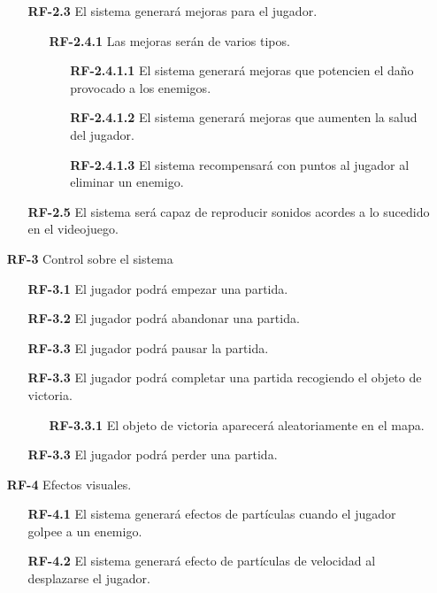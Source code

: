 \begin{enumerate}
\begin{enumerate}
        \item[\textbf{RF-2.3}] El sistema generará mejoras para el jugador. 
        \begin{enumerate}
            \item[\textbf{RF-2.4.1}] Las mejoras serán de varios tipos.
            \begin{enumerate}
                \item[\textbf{RF-2.4.1.1}] El sistema generará mejoras que potencien el daño provocado a los enemigos.
                \item[\textbf{RF-2.4.1.2}] El sistema generará mejoras que aumenten la salud del jugador.
                \item[\textbf{RF-2.4.1.3}] El sistema recompensará con puntos al jugador al eliminar un enemigo.
            \end{enumerate}
        \end{enumerate}
        \item[\textbf{RF-2.5}] El sistema será capaz de reproducir sonidos acordes a lo sucedido en el videojuego.
    \end{enumerate}
    \item[\textbf{RF-3}] Control sobre el sistema
    \begin{enumerate}
        \item[\textbf{RF-3.1}] El jugador podrá empezar una partida.
        \item[\textbf{RF-3.2}] El jugador podrá abandonar una partida.
        \item[\textbf{RF-3.3}] El jugador podrá pausar la partida.
        \item[\textbf{RF-3.3}] El jugador podrá completar una partida recogiendo el objeto de victoria.
        \begin{enumerate}
            \item[\textbf{RF-3.3.1}] El objeto de victoria aparecerá aleatoriamente en el mapa. 
        \end{enumerate}
        \item[\textbf{RF-3.3}] El jugador podrá perder una partida.
    \end{enumerate}
    \item[\textbf{RF-4}] Efectos visuales.
    \begin{enumerate}
        \item[\textbf{RF-4.1}] El sistema generará efectos de partículas cuando el jugador golpee a un enemigo.
        \item[\textbf{RF-4.2}] El sistema generará efecto de partículas de velocidad al desplazarse el jugador. 
    \end{enumerate}


\end{enumerate}
